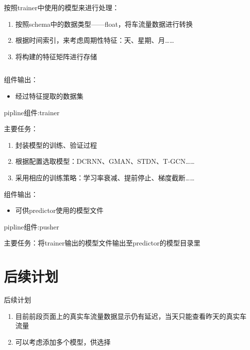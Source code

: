 \documentclass[notheorems, aspectratio=1610]{beamer}
\begin{document}
\begin{frame}
\begin{columns}
\begin{column}{0.5\textwidth}
            \par
            按照trainer中使用的模型来进行处理：
            \begin{enumerate}
                \item 按照schema中的数据类型——float，将车流量数据进行转换
                \item 根据时间索引，来考虑周期性特征：天、星期、月……
                \item 将构建的特征矩阵进行存储
            \end{enumerate}
        \end{column}
    \end{columns}
    组件输出：
    \begin{itemize}
        \item 经过特征提取的数据集
    \end{itemize}
\end{frame}
\begin{frame}
    \Large pipline组件:trainer
    \par
    \hspace*\textwidth
    \par
    \normalsize
    主要任务：
    \begin{enumerate}
        \item 封装模型的训练、验证过程
        \item 根据配置选取模型：DCRNN、GMAN、STDN、T-GCN……
        \item 采用相应的训练策略：学习率衰减、提前停止、梯度截断……
    \end{enumerate}
    组件输出：
    \begin{itemize}
        \item 可供predictor使用的模型文件
    \end{itemize}
\end{frame}

\begin{frame}
    \Large pipline组件:pusher
    \par
    \hspace*\textwidth
    \par
    \normalsize
    主要任务：将trainer输出的模型文件输出至predictor的模型目录里
\end{frame}
\section{后续计划}
\begin{frame}
    \Large 后续计划
    \par
    \hspace*\textwidth
    \par
    \normalsize
    \begin{enumerate}
        \item 目前前段页面上的真实车流量数据显示仍有延迟，当天只能查看昨天的真实车流量
        \item 可以考虑添加多个模型，供选择
    \end{enumerate}
\end{frame}
\end{document}
